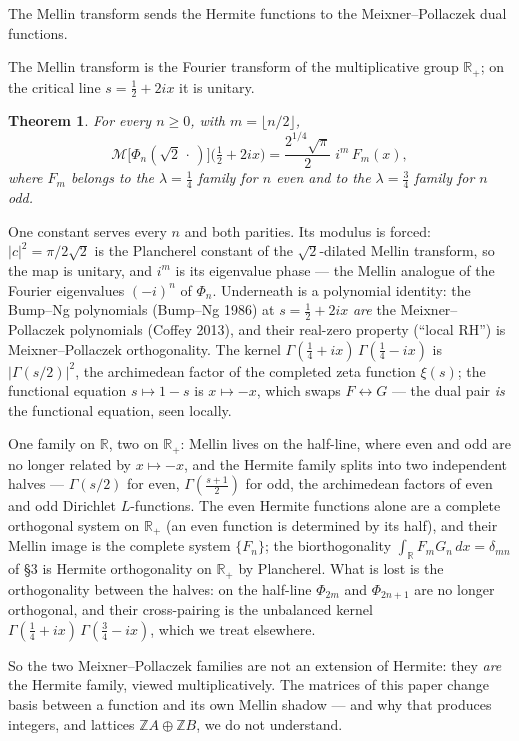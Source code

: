 \documentclass[11pt,a4paper]{article}
\newtheorem{theorem}{Theorem}[section]
\theoremstyle{definition}
\newcommand{\R}{\mathbb{R}}
\newcommand{\Z}{\mathbb{Z}}
\newcommand{\G}{\Gamma}
\begin{document}
\mbox{}\par\vspace{-1.5\baselineskip}
\begin{tcolorbox}[breakable, colback=yellow!10, colframe=yellow!10, boxrule=0pt, sharp corners]
The Mellin transform sends the Hermite functions to the
Meixner--Pollaczek dual functions.

The Mellin transform is the Fourier transform of the multiplicative
group $\R_+$; on the critical line $s = \tfrac12 + 2ix$ it is
unitary.

\begin{tcolorbox}[colback=black!5, colframe=black!5, boxrule=0pt,
  sharp corners]
\begin{theorem}\label{thm:mellin}
For every $n \ge 0$, with $m = \lfloor n/2 \rfloor$,
\[
  \mathcal M\bigl[\Phi_n(\sqrt2\,\cdot\,)\bigr]
  \bigl(\tfrac12 + 2ix\bigr)
  = \frac{2^{1/4}\sqrt{\pi}}{2}\; i^{m}\, F_m(x),
\]
where $F_m$ belongs to the $\lambda = \tfrac14$ family for $n$ even
and to the $\lambda = \tfrac34$ family for $n$ odd.
\end{theorem}
\end{tcolorbox}

One constant serves every $n$ and both parities. Its modulus is
forced: $|c|^2 = \pi/2\sqrt2$ is the Plancherel constant of the
$\sqrt2$-dilated Mellin transform, so the map is unitary, and $i^m$
is its eigenvalue phase --- the Mellin analogue of the Fourier
eigenvalues $(-i)^n$ of $\Phi_n$. Underneath is a polynomial
identity: the Bump--Ng polynomials (Bump--Ng 1986) at
$s = \tfrac12 + 2ix$ \emph{are} the Meixner--Pollaczek polynomials
(Coffey 2013), and their real-zero property (``local RH'') is
Meixner--Pollaczek orthogonality. The kernel
$\G(\tfrac14+ix)\,\G(\tfrac14-ix)$ is $|\G(s/2)|^2$, the archimedean
factor of the completed zeta function $\xi(s)$; the functional
equation $s \mapsto 1-s$ is $x \mapsto -x$, which swaps
$F \leftrightarrow G$ --- the dual pair \emph{is} the functional
equation, seen locally.

\medskip
One family on $\R$, two on $\R_+$: Mellin lives on the half-line,
where even and odd are no longer related by $x \mapsto -x$, and the
Hermite family splits into two independent halves --- $\G(s/2)$ for
even, $\G(\tfrac{s+1}{2})$ for odd, the archimedean factors of even
and odd Dirichlet $L$-functions. The even Hermite functions alone
are a complete orthogonal system on $\R_+$ (an even function is
determined by its half), and their Mellin image is the complete
system $\{F_n\}$; the biorthogonality
$\int_\R F_m G_n\, dx = \delta_{mn}$ of \S3 is Hermite orthogonality
on $\R_+$ by Plancherel. What is lost is the orthogonality between
the halves: on the half-line $\Phi_{2m}$ and $\Phi_{2n+1}$ are no
longer orthogonal, and their cross-pairing is the unbalanced kernel
$\G(\tfrac14+ix)\,\G(\tfrac34-ix)$, which we treat elsewhere.

\medskip
So the two Meixner--Pollaczek families are not an extension of
Hermite: they \emph{are} the Hermite family, viewed
multiplicatively. The matrices of this paper change basis between a
function and its own Mellin shadow --- and why that produces
integers, and lattices $\Z A \oplus \Z B$, we do not understand.
\end{tcolorbox}
\end{document}
